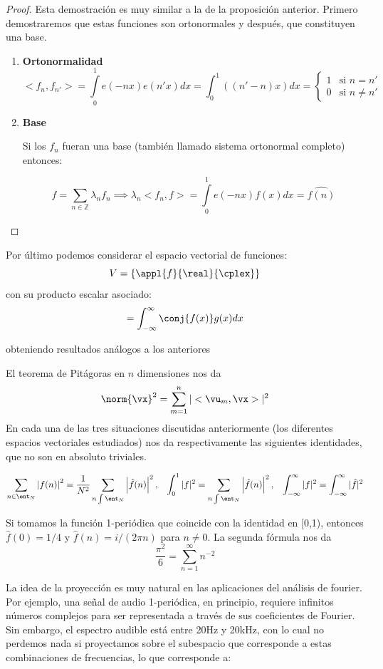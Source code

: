 \begin{proof}
	Esta demostración es muy similar a la de la proposición anterior. Primero demostraremos que estas funciones son ortonormales y después, que constituyen una base.
	\begin{enumerate}
	\item \textbf{Ortonormalidad}
	$$< f_n, f_{n'}> = \int\limits^1_0 e(-nx) e(n'x) dx = \int^1_0 ((n' -n)x) dx =
	\begin{cases}
		1 & \mbox{si } n = n' \\
		0 & \mbox{si } n\neq n'
	\end{cases}$$

	\item \textbf{Base}

	Si los $f_n$ fueran una base (también llamado sistema ortonormal completo) entonces:

	$$f = \sum_{n \in \mathbb{Z}} \lambda_n f_n \implies \lambda_n <f_n, f> = \int\limits^{1}_0 e(-nx) f(x) dx = \hat{f(n)}$$

	\end{enumerate}
\end{proof}

Por último podemos considerar el espacio vectorial de funciones:
\[V = \{\appl{f}{\real}{\cplex}\}\]
con su producto escalar asociado:
\[<f,g> = \int^{\infty}_{-\infty} \conj{f(x)} g(x) dx\]

obteniendo resultados análogos a los anteriores

\begin{corol}
	El teorema de Pitágoras en $n$ dimensiones nos da
	\[\norm{\vx}^2 = \sum_{m=1}^{n}|<\vu_m, \vx>|^2\]
	En cada una de las tres situaciones discutidas anteriormente (los diferentes espacios vectoriales estudiados) nos da respectivamente las siguientes identidades, que no son en absoluto triviales.

	\[\sum_{n \in \ent_N}\left| f(n)\right|^2 = \frac{1}{N^2}\sum_{n \int \ent_N}\left| \hat{f}(n)\right|^2, \;\;\; \int_0^1|f|^2 = \sum_{n \int \ent_N}\left| \hat{f}(n)\right|^2, \;\;\; \int_{-\infty}^{\infty}|f|^2 = \int_{-\infty}^{\infty}|\hat{f}|^2\]

	Si tomamos la función 1-periódica que coincide con la identidad en [0,1), entonces $\hat{f}(0)=1/4$ y $\hat{f}(n)=i/(2πn)$ para $n\neq 0$. La segunda fórmula nos da
	\[\frac{π^2}{6}=\sum_{n=1}^{\infty}n^{-2}\]
\end{corol}


La idea de la proyección es muy natural en las aplicaciones del análisis de fourier. Por ejemplo, una señal de audio 1-periódica, en principio, requiere infinitos números complejos para ser representada a través de sus coeficientes de Fourier. Sin embargo, el espectro audible está entre 20Hz y 20kHz, con lo cual no perdemos nada si proyectamos sobre el subespacio que corresponde a estas combinaciones de frecuencias, lo que corresponde a:

